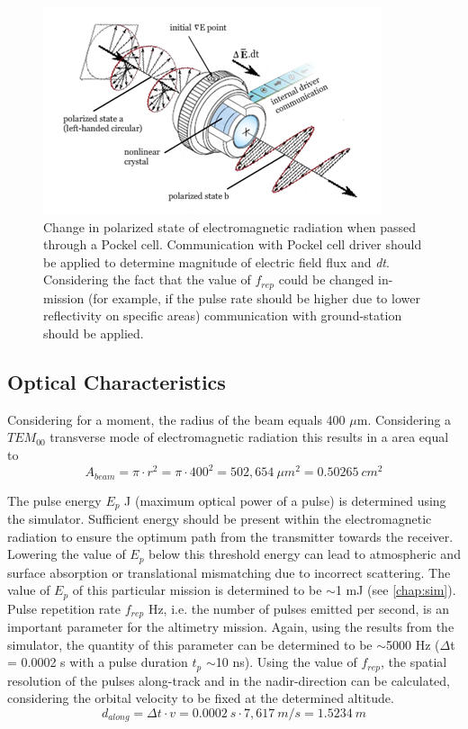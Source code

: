 \begin{figure} [ht]
\centering
\includegraphics[scale=1.2]{chapters/img/laser_polarized.png}	
\caption[Polarized state passed through a Pockel cell]{Change in polarized state of electromagnetic radiation when passed through a Pockel cell. Communication with Pockel cell driver should be applied to determine magnitude of electric field flux and \textit{dt}. Considering the fact that the value of $f_{rep}$ could be changed in-mission (for example, if the pulse rate should be higher due to lower reflectivity on specific areas) communication with ground-station should be applied.}
\label{fig:pockel_cell}
\end{figure}

\subsection{Optical Characteristics} 
\label{opticalchar}
Considering for a moment, the radius of the beam equals 400 $\mu$m. Considering a $TEM_{00}$ transverse mode of electromagnetic radiation this results in a area equal to 
\begin{equation}
\label{area}
A_{beam} = \pi \cdot r^{2} = \pi \cdot 400^{2} = 502,654\ \mu m^{2} = 0.50265\ cm^{2}
\end{equation}

The pulse energy $E_{p}$ J (maximum optical power of a pulse) is determined using the simulator. Sufficient energy should be present within the electromagnetic radiation to ensure the optimum path from the transmitter towards the receiver. Lowering the value of $E_{p}$ below this threshold energy can lead to atmospheric and surface absorption or translational mismatching due to incorrect scattering. The value of $E_{p}$ of this particular mission is determined to be $\sim$1 mJ (see \ref{chap:sim}).
Pulse repetition rate $f_{rep}$ Hz, i.e. the number of pulses emitted per second, is an important parameter for the altimetry mission. Again, using the results from the simulator, the quantity of this parameter can be determined to be $\sim$5000 Hz ($\Delta$t = 0.0002 s with a pulse duration $t_{p}$ $\sim$10 ns). Using the value of $f_{rep}$, the spatial resolution of the pulses along-track and in the nadir-direction can be calculated, considering the orbital velocity to be fixed at the determined altitude.  
\begin{equation}
\label{alongtrackres}
d_{along} = \Delta t \cdot v = 0.0002\ s \cdot 7,617\ m/s = 1.5234\ m
\end{equation}

